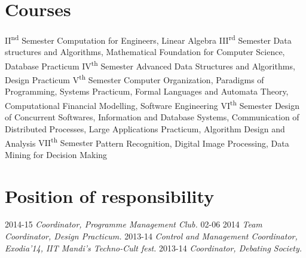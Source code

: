 \documentclass[]{friggeri-cv}
\begin{document}

\section{Courses}
\begin{entrylist}
  \courseentry
  	{II\textsuperscript{nd} Semester}
  	{Computation for Engineers, Linear Algebra}
  \courseentry
  	{III\textsuperscript{rd} Semester}
  	{Data structures and Algorithms, Mathematical Foundation for Computer Science, Database Practicum}
  \courseentry
  	{IV\textsuperscript{th} Semester}
  	{Advanced Data Structures and Algorithms, Design Practicum}
  \courseentry
  	{V\textsuperscript{th} Semester}
  	{Computer Organization, Paradigms of Programming, Systems Practicum, Formal Languages and Automata Theory, Computational Financial Modelling, Software Engineering}
  \courseentry
  	{VI\textsuperscript{th} Semester}
  	{Design of Concurrent Softwares, Information and Database Systems, Communication of Distributed Processes, Large Applications Practicum, Algorithm Design and Analysis}
  \courseentry
  	{VII\textsuperscript{th} Semester}
  	{Pattern Recognition, Digital Image Processing, Data Mining for Decision Making}
\end{entrylist}

\section{Position of responsibility}

\begin{entrylist}
  \responsibilityentry
  	{2014-15}
  	{\emph{Coordinator, Programme Management Club.}}
  \responsibilityentry
  	{02-06 2014}
  	{\emph{Team Coordinator, Design Practicum.}}
  \responsibilityentry
  	{2013-14}
  	{\emph{Control and Management Coordinator, Exodia’14, IIT Mandi’s Techno-Cult fest.}}
  \responsibilityentry
  	{2013-14}
  	{\emph{Coordinator, Debating Society.}}
\end{entrylist}
\end{document}
